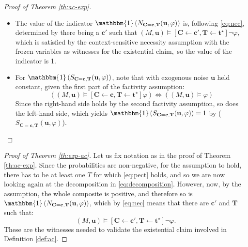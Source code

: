 \documentclass[twoside,11pt]{article}
\begin{document}
\begin{proof}[Proof of Theorem \ref{th:ac-exp}]
\begin{itemize}
\item The value of the indicator $\mathbbm{1}\left(N_{\mathbf{C} = \mathbf{c}, \mathbf{T}}(\mathbf{u}, \varphi)\right)$ is, following \eqref{eq:nec}, determined by there being a $\mathbf{c'}$ such that 
$(M, \mathbf{u}) \vDash [\mathbf{C} \leftarrow \mathbf{c'}, \mathbf{T} \leftarrow \mathbf{t}^\star]\neg \varphi$, which is satisfied by the context-sensitive necessity assumption with the frozen variables as witnesses for the existential claim, so the value of the indicator is 1.

\item For $\mathbbm{1}\left(S_{\mathbf{C} = \mathbf{c}, \mathbf{T}}(\mathbf{u}, \varphi)\right)$,  note that with exogenous noise $\mathbf{u}$ held constant, given the first part of the factivity assumption:
\[\left( (M, \mathbf{u}) 
    \vDash [\mathbf{C} \leftarrow \mathbf{c}, \mathbf{T} \leftarrow \mathbf{t}^\star]\varphi \right) \Leftrightarrow \left( (M, \mathbf{u})\models \varphi\right) \] \noindent  Since the right-hand side holds by the second factivity assumption, so does the left-hand side, which yields $\mathbbm{1}\left(S_{\mathbf{C} = \mathbf{c}, \mathbf{T}}(\mathbf{u}, \varphi)\right) =1$ by \linebreak ($S_{\mathbf{C} = \mathbf{c}, \mathbf{T}}(\mathbf{u}, \varphi)$).

\end{itemize}
\end{proof}




\begin{proof}[Proof of Theorem \ref{th:exp-ac}] Let us fix notation as in the proof of Theorem \ref{th:ac-exp}.  Since the probabilities are non-negative, for the assumption to hold, there has to be at least one $T$ for which \eqref{eq:pect} holds, and so we are now looking again at the decomposition in \eqref{eq:decomposition}. However, now, by the assumption, the whole composite is positive, and therefore so is $\mathbbm{1}\left(N_{\mathbf{C} = \mathbf{c}, \mathbf{T}}(\mathbf{u}, \varphi)\right)$, which by \eqref{eq:nec} means that there are $\mathbf{c'}$ and $\mathbf{T}$ such that: 
\[
    (M, \mathbf{u}) \vDash [\mathbf{C} \leftarrow \mathbf{c'}, \mathbf{T} \leftarrow \mathbf{t}^\star]\neg \varphi.\] These are the witnesses needed to validate the existential claim involved in Definition \eqref{def:ac}.
\end{proof}
\end{document}
